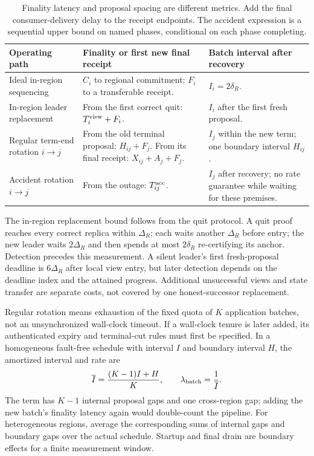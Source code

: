 \begin{table}[H]\centering\small
\begin{tabularx}{\linewidth}{@{}>{\raggedright\arraybackslash}p{.24\linewidth}Y Y@{}}
\toprule
Operating path & Finality or first new final receipt & Batch interval after recovery\\
\midrule
Ideal in-region sequencing & $C_i$ to regional commitment;
$F_i$ to a transferable receipt. & $I_i=2\delta_R$.\\
\addlinespace[3pt]
In-region leader replacement & From the first correct quit:
$T_i^{\rm view}+F_i$. & $I_i$ after the first fresh proposal.\\
\addlinespace[3pt]
Regular term-end rotation $i\to j$ & From the old terminal proposal:
$H_{ij}+F_j$. From its final receipt: $X_{ij}+A_j+F_j$. &
$I_j$ within the new term; one boundary interval $H_{ij}$.\\
\addlinespace[3pt]
Accident rotation $i\to j$ & From the outage:
$T_{ij}^{\rm acc}$.
& $I_j$ after recovery; no rate guarantee while waiting for these premises.\\
\bottomrule
\end{tabularx}
\caption{Finality latency and proposal spacing are different metrics.
Add the final consumer-delivery delay to the receipt endpoints.
The accident expression is a sequential upper bound on named phases,
conditional on each phase completing.}
\label{tab:operating-paths}
\end{table}

The in-region replacement bound follows from the quit protocol. A quit proof
reaches every correct replica within $\Delta_R$; each waits another
$\Delta_R$ before entry; the new leader waits $2\Delta_R$ and then spends
at most $2\delta_R$ re-certifying its anchor. Detection precedes this
measurement. A silent leader's first fresh-proposal deadline is
$6\Delta_R$ after local view entry, but later detection depends on the
deadline index and the attained progress. Additional unsuccessful views
and state transfer are separate costs, not covered by one honest-successor
replacement.

Regular rotation means exhaustion of the fixed quota of $K$ application
batches, not an unsynchronized wall-clock timeout. If a wall-clock tenure
is later added, its authenticated expiry and terminal-cut rules must first
be specified. In a homogeneous fault-free schedule with interval $I$ and
boundary interval $H$, the amortized interval and rate are
\[
 \overline I=\frac{(K-1)I+H}{K},
 \qquad \lambda_{\rm batch}=\frac{1}{\overline I}.
\]
The term has $K-1$ internal proposal gaps and one cross-region gap; adding
the new batch's finality latency again would double-count the pipeline.
For heterogeneous regions, average the corresponding sums of internal
gaps and boundary gaps over the actual schedule. Startup and final drain
are boundary effects for a finite measurement window.

